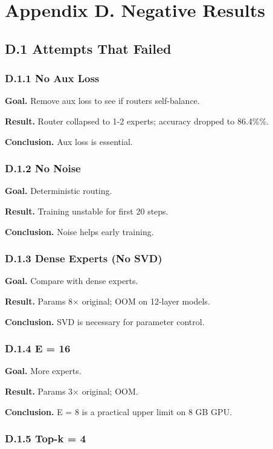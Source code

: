 \section{Appendix D. Negative Results}

\subsection{D.1 Attempts That Failed}

\subsubsection{D.1.1 No Aux Loss}

\textbf{Goal.} Remove aux loss to see if routers self-balance.

\textbf{Result.} Router collapsed to 1-2 experts; accuracy dropped to 86.4\%\%.

\textbf{Conclusion.} Aux loss is essential.

\subsubsection{D.1.2 No Noise}

\textbf{Goal.} Deterministic routing.

\textbf{Result.} Training unstable for first 20 steps.

\textbf{Conclusion.} Noise helps early training.

\subsubsection{D.1.3 Dense Experts (No SVD)}

\textbf{Goal.} Compare with dense experts.

\textbf{Result.} Params 8$\times$ original; OOM on 12-layer models.

\textbf{Conclusion.} SVD is necessary for parameter control.

\subsubsection{D.1.4 E = 16}

\textbf{Goal.} More experts.

\textbf{Result.} Params 3$\times$ original; OOM.

\textbf{Conclusion.} E = 8 is a practical upper limit on 8 GB GPU.

\subsubsection{D.1.5 Top-k = 4}

